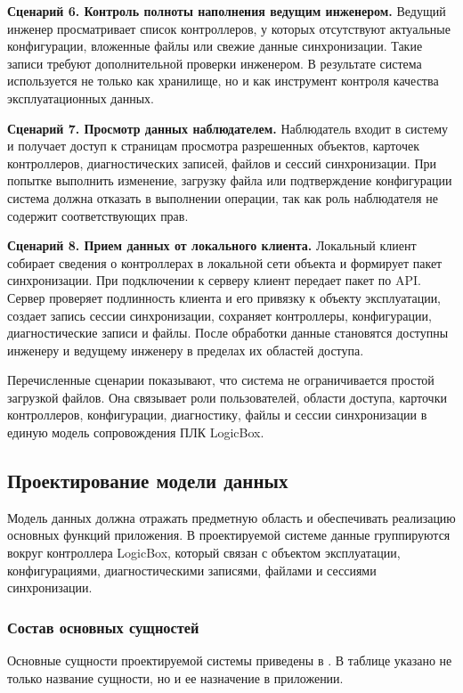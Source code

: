 \textbf{Сценарий 6. Контроль полноты наполнения ведущим инженером.} Ведущий инженер просматривает список контроллеров, у которых отсутствуют актуальные конфигурации, вложенные файлы или свежие данные синхронизации. Такие записи требуют дополнительной проверки инженером. В результате система используется не только как хранилище, но и как инструмент контроля качества эксплуатационных данных.

\textbf{Сценарий 7. Просмотр данных наблюдателем.} Наблюдатель входит в систему и получает доступ к страницам просмотра разрешенных объектов, карточек контроллеров, диагностических записей, файлов и сессий синхронизации. При попытке выполнить изменение, загрузку файла или подтверждение конфигурации система должна отказать в выполнении операции, так как роль наблюдателя не содержит соответствующих прав.

\textbf{Сценарий 8. Прием данных от локального клиента.} Локальный клиент собирает сведения о контроллерах в локальной сети объекта и формирует пакет синхронизации. При подключении к серверу клиент передает пакет по API. Сервер проверяет подлинность клиента и его привязку к объекту эксплуатации, создает запись сессии синхронизации, сохраняет контроллеры, конфигурации, диагностические записи и файлы. После обработки данные становятся доступны инженеру и ведущему инженеру в пределах их областей доступа.

Перечисленные сценарии показывают, что система не ограничивается простой загрузкой файлов. Она связывает роли пользователей, области доступа, карточки контроллеров, конфигурации, диагностику, файлы и сессии синхронизации в единую модель сопровождения ПЛК LogicBox.

\subsection{Проектирование модели данных}

Модель данных должна отражать предметную область и обеспечивать реализацию
основных функций приложения. В проектируемой системе данные группируются вокруг
контроллера LogicBox, который связан с объектом эксплуатации, конфигурациями,
диагностическими записями, файлами и сессиями синхронизации.

\subsubsection{Состав основных сущностей}

Основные сущности проектируемой системы приведены в . В
таблице указано не только название сущности, но и ее назначение в приложении.


